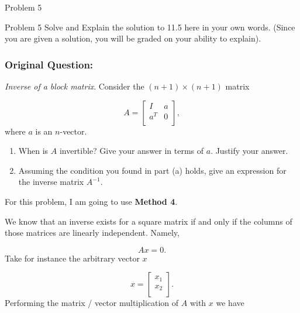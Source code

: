 \begin{problem}{Problem 5}
    \begin{statement}{Problem 5}
        Solve and Explain the solution to 11.5 here in your own words. (Since you are given a solution, you will be graded on your ability to explain).

        \subsubsection*{Original Question:}

        \textit{Inverse of a block matrix}. Consider the $(n + 1) \times (n + 1)$ matrix

        \begin{equation*}
            A = 
            \begin{bmatrix}
                I & a \\
                a^{T} & 0 \\
            \end{bmatrix},
        \end{equation*}
        where $a$ is an $n$-vector.

        \begin{enumerate}[label = (\alph*)]
            \item When is $A$ invertible? Give your answer in terms of $a$. Justify your answer.
            \item Assuming the condition you found in part (a) holds, give an expression for the inverse matrix $A^{-1}$.
        \end{enumerate}
    \end{statement}

    \begin{Highlight}
        \noindent For this problem, I am going to use \textbf{Method 4}. \vspace*{1em}

        We know that an inverse exists for a square matrix if and only if the columns of those matrices are linearly independent. Namely,

        \setcounter{equation}{0}
        \begin{equation}
            Ax = 0.
        \end{equation}
        Take for instance the arbitrary vector $x$

        \begin{equation}
            x = 
            \begin{bmatrix}
                x_{1} \\
                x_{2} \\
            \end{bmatrix}.
        \end{equation}
        Performing the matrix / vector multiplication of $A$ with $x$ we have


\end{Highlight}
\end{problem}

